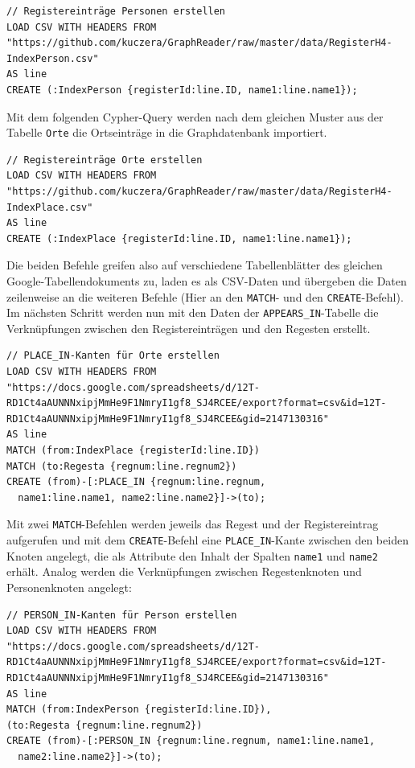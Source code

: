 \documentclass[ngerman,]{scrreprt}
\begin{document}
\begin{verbatim}
// Registereinträge Personen erstellen
LOAD CSV WITH HEADERS FROM "https://github.com/kuczera/GraphReader/raw/master/data/RegisterH4-IndexPerson.csv"
AS line
CREATE (:IndexPerson {registerId:line.ID, name1:line.name1});
\end{verbatim}

Mit dem folgenden Cypher-Query werden nach dem gleichen Muster aus der Tabelle \texttt{Orte} die Ortseinträge in die Graphdatenbank importiert.

\begin{verbatim}
// Registereinträge Orte erstellen
LOAD CSV WITH HEADERS FROM "https://github.com/kuczera/GraphReader/raw/master/data/RegisterH4-IndexPlace.csv"
AS line
CREATE (:IndexPlace {registerId:line.ID, name1:line.name1});
\end{verbatim}

Die beiden Befehle greifen also auf verschiedene Tabellenblätter des gleichen Google-Tabellendokuments zu, laden es als CSV-Daten und übergeben die Daten zeilenweise an die weiteren Befehle (Hier an den \texttt{MATCH}- und den \texttt{CREATE}-Befehl). Im nächsten Schritt werden nun mit den Daten der \texttt{APPEARS\_IN}-Tabelle die Verknüpfungen zwischen den Registereinträgen und den Regesten erstellt.

\begin{verbatim}
// PLACE_IN-Kanten für Orte erstellen
LOAD CSV WITH HEADERS FROM "https://docs.google.com/spreadsheets/d/12T-RD1Ct4aAUNNNxipjMmHe9F1NmryI1gf8_SJ4RCEE/export?format=csv&id=12T-RD1Ct4aAUNNNxipjMmHe9F1NmryI1gf8_SJ4RCEE&gid=2147130316"
AS line
MATCH (from:IndexPlace {registerId:line.ID})
MATCH (to:Regesta {regnum:line.regnum2})
CREATE (from)-[:PLACE_IN {regnum:line.regnum,
  name1:line.name1, name2:line.name2}]->(to);
\end{verbatim}

Mit zwei \texttt{MATCH}-Befehlen werden jeweils das Regest und der Registereintrag aufgerufen und mit dem \texttt{CREATE}-Befehl eine \texttt{PLACE\_IN}-Kante zwischen den beiden Knoten angelegt, die als Attribute den Inhalt der Spalten \texttt{name1} und \texttt{name2} erhält. Analog werden die Verknüpfungen zwischen Regestenknoten und Personenknoten angelegt:

\begin{verbatim}
// PERSON_IN-Kanten für Person erstellen
LOAD CSV WITH HEADERS FROM "https://docs.google.com/spreadsheets/d/12T-RD1Ct4aAUNNNxipjMmHe9F1NmryI1gf8_SJ4RCEE/export?format=csv&id=12T-RD1Ct4aAUNNNxipjMmHe9F1NmryI1gf8_SJ4RCEE&gid=2147130316"
AS line
MATCH (from:IndexPerson {registerId:line.ID}),
(to:Regesta {regnum:line.regnum2})
CREATE (from)-[:PERSON_IN {regnum:line.regnum, name1:line.name1,
  name2:line.name2}]->(to);
\end{verbatim}
\end{document}
